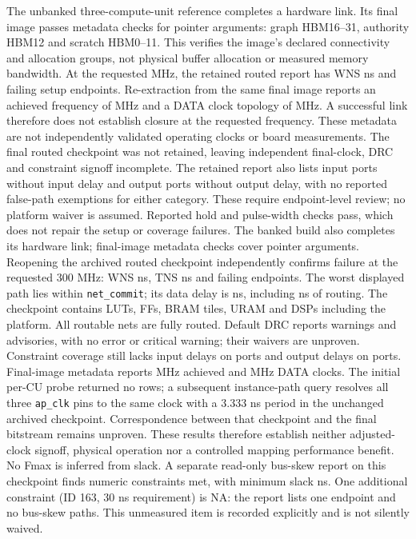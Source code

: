 \documentclass[10pt]{article}
\begin{document}
The unbanked three-compute-unit reference completes a hardware link.
Its final image passes metadata checks for \HardwarePointers{} pointer
arguments: graph HBM16--31, authority HBM12 and scratch HBM0--11.
This verifies the image's declared connectivity and allocation groups,
not physical buffer allocation or measured memory bandwidth.
At the requested \HardwareRequestedMHz{} MHz, the retained routed report
has WNS \HardwareWNS{} ns and \HardwareFailingEndpoints{} failing setup
endpoints. Re-extraction from the same final image reports an achieved
frequency of \HardwareReportedMHz{} MHz and a DATA clock topology of
\HardwareDataMHz{} MHz. A successful link therefore does not establish
closure at the requested frequency. These metadata are not independently
validated operating clocks or board measurements. The final routed
checkpoint was not retained, leaving independent final-clock, DRC and
constraint signoff incomplete. The retained report also lists
\HardwareNoInputDelay{} input ports without input delay and
\HardwareNoOutputDelay{} output ports without output delay, with no reported
false-path exemptions for either category. These require endpoint-level
review; no platform waiver is assumed. Reported hold and pulse-width checks
pass, which does not repair the setup or coverage failures.
The banked build also completes its hardware link; final-image metadata
checks cover \BankedPointers{} pointer arguments. Reopening the archived
routed checkpoint independently confirms failure at the requested 300 MHz:
WNS \BankedSnapshotWNS{} ns, TNS \BankedSnapshotTNS{} ns and
\BankedSnapshotFailingEndpoints{} failing endpoints. The worst displayed
path lies within \texttt{net\_commit}; its data delay is
\BankedSnapshotWorstData{} ns, including \BankedSnapshotWorstRoute{} ns
of routing. The checkpoint contains \BankedLUT{} LUTs, \BankedFF{} FFs,
\BankedBRAM{} BRAM tiles, \BankedURAM{} URAM and \BankedDSP{} DSPs including
the platform. All routable nets are fully routed. Default DRC reports
\BankedDRCWarnings{} warnings and \BankedDRCAdvisories{} advisories, with
no error or critical warning; their waivers are unproven. Constraint
coverage still lacks input delays on \BankedNoInputDelay{} ports and output
delays on \BankedNoOutputDelay{} ports. Final-image metadata reports
\BankedReportedMHz{} MHz achieved and \BankedDataMHz{} MHz DATA clocks.
The initial per-CU probe returned no rows; a subsequent instance-path
query resolves all three \texttt{ap\_clk} pins to the same clock with a
3.333 ns period in the unchanged archived checkpoint. Correspondence
between that checkpoint and the final bitstream remains unproven. These results
therefore establish neither adjusted-clock signoff, physical operation
nor a controlled mapping performance benefit. No Fmax is inferred from slack.
A separate read-only bus-skew report on this checkpoint finds
\BusSkewNumericConstraints{} numeric constraints met, with minimum slack
\BusSkewMinimumSlack{} ns. One additional constraint (ID 163, 30 ns
requirement) is NA: the report lists one endpoint and no bus-skew paths.
This unmeasured item is recorded explicitly and is not silently waived.
\end{document}
